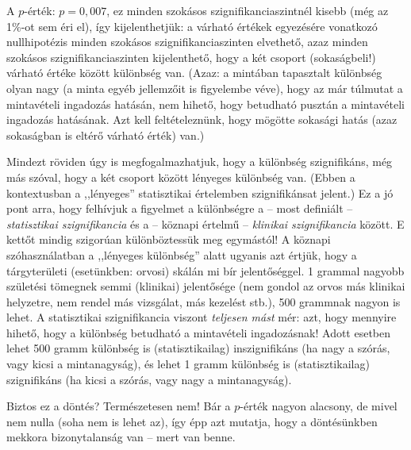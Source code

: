 \documentclass[]{book}
\begin{document}
A \(p\)-érték: \(p=0,\!007\), ez minden szokásos szignifikanciaszintnél kisebb (még az 1\%-ot sem éri el), így kijelenthetjük: a várható értékek egyezésére vonatkozó nullhipotézis minden szokásos szignifikanciaszinten elvethető, azaz minden szokásos szignifikanciaszinten kijelenthető, hogy a két csoport (sokaságbeli!) várható értéke között különbség van. (Azaz: a mintában tapasztalt különbség olyan nagy (a minta egyéb jellemzőit is figyelembe véve), hogy az már túlmutat a mintavételi ingadozás hatásán, nem hihető, hogy betudható pusztán a mintavételi ingadozás hatásának. Azt kell feltételeznünk, hogy mögötte sokasági hatás (azaz sokaságban is eltérő várható érték) van.)

Mindezt röviden úgy is megfogalmazhatjuk, hogy a különbség szignifikáns, még más szóval, hogy a két csoport között lényeges különbség van. (Ebben a kontextusban a ,,lényeges'' statisztikai értelemben szignifikánsat jelent.) Ez a jó pont arra, hogy felhívjuk a figyelmet a különbségre a -- most definiált -- \emph{statisztikai szignifikancia} és a -- köznapi értelmű -- \emph{klinikai szignifikancia} között. E kettőt mindig szigorúan különböztessük meg egymástól! A köznapi szóhasználatban a ,,lényeges különbség'' alatt ugyanis azt értjük, hogy a tárgyterületi (esetünkben: orvosi) skálán mi bír jelentőséggel. 1 grammal nagyobb születési tömegnek semmi (klinikai) jelentősége (nem gondol az orvos más klinikai helyzetre, nem rendel más vizsgálat, más kezelést stb.), 500 grammnak nagyon is lehet. A statisztikai szignifikancia viszont \emph{teljesen mást} mér: azt, hogy mennyire hihető, hogy a különbség betudható a mintavételi ingadozásnak! Adott esetben lehet 500 gramm különbség is (statisztikailag) inszignifikáns (ha nagy a szórás, vagy kicsi a mintanagyság), és lehet 1 gramm különbség is (statisztikailag) szignifikáns (ha kicsi a szórás, vagy nagy a mintanagyság).

Biztos ez a döntés? Természetesen nem! Bár a \(p\)-érték nagyon alacsony, de mivel nem nulla (soha nem is lehet az), így épp azt mutatja, hogy a döntésünkben mekkora bizonytalanság van -- mert van benne.
\end{document}
